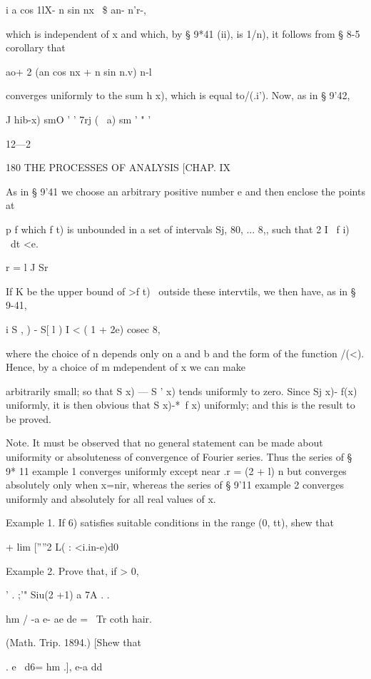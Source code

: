 i a  cos 1lX-  n sin nx \ \$  an- n'r-, 

which is independent of x and which, by § 9*41 (ii), is  1/n), it follows from § 8-5 
corollary that 

 ao+ 2 (an cos nx +  n sin n.v) 
n-l 

converges uniformly to the sum h x), which is equal to/(.i'). 
Now, as in § 9'42, 

   J hib-x) smO  ' ' 7rj ( \ a) sm   ' "  ' 

12—2 



180 THE PROCESSES OF ANALYSIS [CHAP. IX 

As in § 9'41 we choose an arbitrary positive number e and then enclose the points at 

p f 
which f t) is unbounded in a set of intervals Sj, 80, ... 8,, such that 2 I \ f i) \ dt <e. 

r = l J Sr 

If K be the upper bound of >f t) \ outside these intervtils, we then have, as in § 9-41, 

i S ,   ) - S[ l   ) I < ( 1   + 2e) cosec 8, 

where the choice of n depends only on a and b and the form of the function /(<). Hence, 
by a choice of m mdependent of x we can make 

arbitrarily small; so that S  x) — S '  x) tends uniformly to zero. Since Sj x)- f(x) 
uniformly, it is then obvious that S  x)-*~f x) uniformly; and this is the result to be 
proved. 

Note. It must be observed that no general statement can be made about uniformity 
or absoluteness of convergence of Fourier series. Thus the series of § 9* 11 example 1 
converges uniformly except near .r = (2  + l) n but converges absolutely only when x=nir, 
whereas the series of § 9'11 example 2 converges uniformly and absolutely for all real 
values of x. 

Example 1. If  6) satisfies suitable conditions in the range (0, tt), shew that 

+ lim [''''2 L( : <i.in-e)d0 

Example 2. Prove that, if   > 0, 

' . ;'" Siu(2 +1)  a 7A   . .  

hm / -a e- ae de = \ Tr coth hair. 

(Math. Trip. 1894.) 
[Shew that 



  .   e~  d6= hm .], e-a dd 

